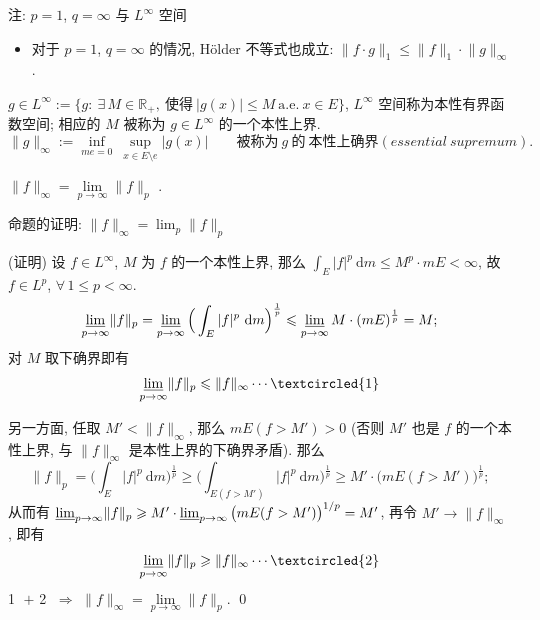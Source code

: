 
\begin{frame}{注: $p = 1$, $q = \infty$ 与 $L^\infty$ 空间}

\begin{itemize}
\item 对于 $p = 1$, $q = \infty$ 的情况, Hölder 不等式也成立:
  $\lVert f \cdot g \rVert_1 \leqslant \lVert f \rVert_1 \cdot \lVert g \rVert_\infty$.
\end{itemize}

\pause

\begin{Def}[$L^\infty$ 空间]
$g \in L^\infty := \big\{ g:\ \exists\, M \in \mathbb{R}_+,\ \text{使得}\ |g(x)| \leqslant M
\ \text{a.e.}\ x \in E \big\}$, $L^\infty$ 空间称为\alert{本性有界函数空间};
相应的 $M$ 被称为 $g \in L^\infty$ 的一个\alert{本性上界}.
\[
\lVert g \rVert_\infty := \inf_{m e = 0}\ \sup_{x \in E \setminus e} |g(x)|
\qquad
\text{被称为}\ g\ \text{的}\ \textbf{本性上确界} (essential\ supremum) .
\]
\end{Def}

\pause

\begin{prop}
$\lVert f \rVert_\infty = \lim\limits_{p \to \infty} \lVert f \rVert_p$ .
\end{prop}

\end{frame}


\begin{frame}{命题的证明: $\lVert f \rVert_\infty = \lim_p \lVert f \rVert_p$}

\startproof[bg=yellow, fg=red](证明)
设 $f \in L^\infty$, $M$ 为 $f$ 的一个本性上界, 那么
$\int_E |f|^p ~ \mathrm{d} m \leqslant M^p \cdot mE < \infty$, 故 $f \in L^p$,
$\forall\, 1 \leqslant p < \infty$.
\[
\varliminf_{p \to \infty} \lVert f \rVert_p
= \varliminf_{p \to \infty} \Big( \int_E |f|^p ~ \mathrm{d} m \Big)^{\frac1p}
\leqslant \varliminf_{p \to \infty} M \cdot (mE)^{\frac1p} = M ;
\]
对 $M$ 取下确界即有
\[
\varliminf_{p \to \infty} \lVert f \rVert_p \leqslant \lVert f \rVert_\infty \cdots \textcircled{1}
\]

\pause

另一方面, 任取 $M' < \lVert f \rVert_\infty$, 那么 $mE(f > M') > 0$
(否则 $M'$ 也是 $f$ 的一个本性上界, 与 $\lVert f \rVert_\infty$ 是本性上界的下确界矛盾).
那么
\[
\lVert f \rVert_p
= \Big( \int_E |f|^p ~ \mathrm{d} m \Big)^{\frac1p}
\geqslant \Big( \int_{E(f > M')} |f|^p ~ \mathrm{d} m \Big)^{\frac1p}
\geqslant M' \cdot \big( mE(f > M') \big)^{\frac1p} ;
\]
从而有
$\varliminf_{p \to \infty} \lVert f \rVert_p \geqslant M' \cdot \varliminf_{p \to \infty}
\big( mE(f > M') \big)^{1/p} = M'$, 再令 $M' \to \lVert f \rVert_\infty$, 即有
\[
\varliminf_{p \to \infty} \lVert f \rVert_p \geqslant \lVert f \rVert_\infty \cdots \textcircled{2}
\]
\textcircled{1} $+$ \textcircled{2} $\Longrightarrow$
$\lVert f \rVert_\infty = \lim\limits_{p \to \infty} \lVert f \rVert_p$.
\qed

\end{frame}


